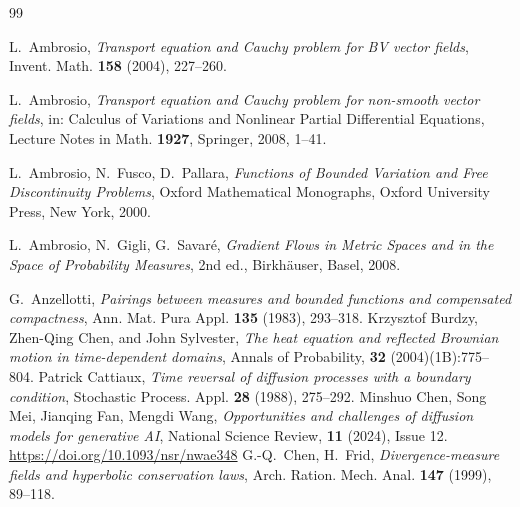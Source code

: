 \documentclass[11pt]{amsart}
\theoremstyle{definition}
\begin{document}
\newpage 
\begin{thebibliography}{99}

L.~Ambrosio,
\emph{Transport equation and Cauchy problem for BV vector fields},
Invent. Math. \textbf{158} (2004), 227--260.

L.~Ambrosio,
\emph{Transport equation and Cauchy problem for non-smooth vector
fields}, in: Calculus of Variations and Nonlinear Partial
Differential Equations, Lecture Notes in Math. \textbf{1927},
Springer, 2008, 1--41.

L.~Ambrosio, N.~Fusco, D.~Pallara,
\emph{Functions of Bounded Variation and Free Discontinuity
Problems}, Oxford Mathematical Monographs, Oxford University Press,
New York, 2000.

L.~Ambrosio, N.~Gigli, G.~Savar\'e,
\emph{Gradient Flows in Metric Spaces and in the Space of Probability
Measures}, 2nd ed., Birkh\"auser, Basel, 2008.

G.~Anzellotti,
\emph{Pairings between measures and bounded functions and
compensated compactness}, Ann. Mat. Pura Appl. \textbf{135} (1983),
293--318.
Krzysztof Burdzy, Zhen-Qing Chen, and John Sylvester, \emph{The heat equation and reflected Brownian motion in time-dependent domains},  Annals of Probability, \textbf{32} (2004)(1B):775–804.
Patrick Cattiaux,
\emph{Time reversal of diffusion processes with a boundary
condition}, Stochastic Process. Appl. \textbf{28} (1988), 275--292.
Minshuo Chen, Song Mei, Jianqing Fan, Mengdi Wang, \emph{Opportunities and challenges of diffusion models for generative AI}, National Science Review, \textbf{11} (2024), Issue 12.
\url{https://doi.org/10.1093/nsr/nwae348}
G.-Q.~Chen, H.~Frid,
\emph{Divergence-measure fields and hyperbolic conservation laws},
Arch. Ration. Mech. Anal. \textbf{147} (1999), 89--118.


\end{thebibliography}
\end{document}
